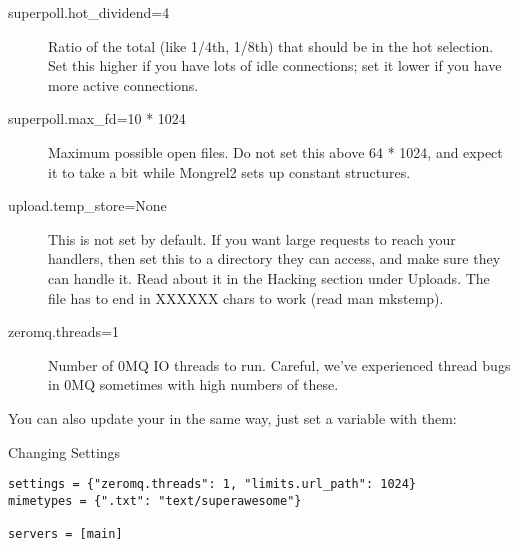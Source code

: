 \begin{description}
\item[superpoll.hot\_dividend=4] Ratio of the total (like 1/4th, 1/8th) that should be in the hot selection.  Set this higher if you have lots of idle connections; set it lower if you have more active connections.
\item[superpoll.max\_fd=10 * 1024] Maximum possible open files.  Do not set this above 64 * 1024, and expect it to take a bit while Mongrel2 sets up constant structures.
\item[upload.temp\_store=None] This is not set by default.  If you want large requests to reach your handlers, then set this to a directory they can access, and make sure they can handle it.  Read about it in the Hacking section under Uploads.  The file has to end in XXXXXX chars to work (read man mkstemp).
\item[zeromq.threads=1] Number of 0MQ IO threads to run.  Careful, we've experienced thread bugs in 0MQ sometimes with high numbers of these.
\end{description}


You can also update your  in the same way, just set a variable with them:

\begin{code}{Changing Settings}
\begin{lstlisting}
settings = {"zeromq.threads": 1, "limits.url_path": 1024}
mimetypes = {".txt": "text/superawesome"}

servers = [main]
\end{lstlisting}
\end{code}

